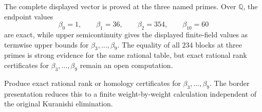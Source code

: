 \begin{remark}
\label{rem:rational-betti-boundary}
The complete displayed vector is proved at the three named primes.  Over
\(\mathbb Q\), the endpoint values
\[
\beta_0=1,\qquad\beta_1=36,\qquad\beta_2=354,\qquad
\beta_{10}=60
\]
are exact, while upper semicontinuity gives the displayed finite-field
values as termwise upper bounds for \(\beta_3,\ldots,\beta_9\). The
equality of all \(234\) blocks at three primes is strong evidence for the
same rational table, but exact rational rank certificates for
\(\beta_3,\ldots,\beta_9\) remain an open computation.
\end{remark}

\begin{question}
\label{q:rational-betti}
Produce exact rational rank or homology certificates for
\(\beta_3,\ldots,\beta_9\). The border presentation reduces this to a finite
weight-by-weight calculation independent of the original Kuranishi
elimination.
\end{question}
